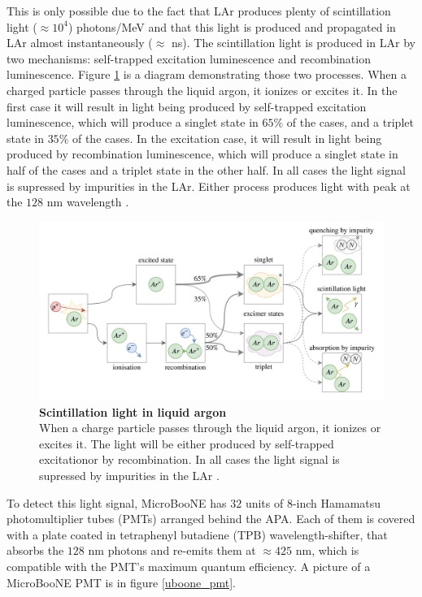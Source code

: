 This is only possible due to the fact that LAr produces plenty of scintillation light ($\approx 10^4 $) photons/MeV and that this light is produced and propagated in LAr almost instantaneously ($\approx$ ns). The scintillation light is produced in LAr by two mechanisms: self-trapped excitation luminescence and recombination luminescence. Figure \ref{lar_excimers} is a diagram demonstrating those two processes. When a charged particle passes through the liquid argon, it ionizes or excites it. In the first case it will result in light being produced by self-trapped excitation luminescence, which will produce a singlet state in $65\%$ of the cases, and a triplet state in $35\%$ of the cases. In the excitation case, it will result in light being produced by recombination luminescence, which will produce a singlet state in half of the cases and a triplet state in the other half. In all cases the light signal is supressed by impurities in the LAr. Either process produces light with peak at the $128$ nm wavelength \cite{lar_excimers}.

\begin{figure}[h!]
    \begin{center}
        \includegraphics[scale=0.35]{Figures/lar_excimers.png}
        \caption[Scintillation light in liquid argon]{{\textbf{Scintillation light in liquid argon}} \\When a charge particle passes through the liquid argon, it ionizes or excites it. The light will be either produced by self-trapped excitationor by recombination. In all cases the light signal is supressed by impurities in the LAr \cite{lar_excimers}.}
        \label{lar_excimers} 
    \end{center}
\end{figure}

To detect this light signal, MicroBooNE has $32$ units of 8-inch Hamamatsu photomultiplier tubes (PMTs) arranged behind the APA. Each of them is covered with a plate coated in tetraphenyl butadiene (TPB) wavelength-shifter, that absorbs the $128$ nm photons and re-emits them at $\approx425$ nm, which is compatible with the PMT's maximum quantum efficiency. A picture of a MicroBooNE PMT is in figure \ref{uboone_pmt}.

